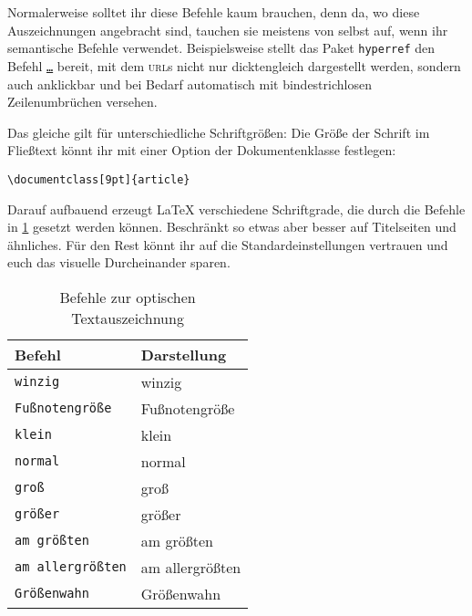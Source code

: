 Normalerweise solltet ihr diese Befehle kaum brauchen, denn da, wo diese Auszeichnungen angebracht sind, tauchen sie meistens von selbst auf, wenn ihr semantische Befehle verwendet.
Beispielsweise stellt das Paket \texttt{hyperref} den Befehl \texttt{\url{…}} bereit, mit dem \textsc{url}s nicht nur dicktengleich dargestellt werden, sondern auch anklickbar und bei Bedarf automatisch mit bindestrichlosen Zeilenumbrüchen versehen.

Das gleiche gilt für unterschiedliche Schriftgrößen: 
Die Größe der Schrift im Fließtext könnt ihr mit einer Option der Dokumentenklasse festlegen: 
\begin{verbatim}
\documentclass[9pt]{article}
\end{verbatim}
Darauf aufbauend erzeugt \LaTeX{} verschiedene Schriftgrade, die durch die Befehle in \cref{tbl:type-sizes} gesetzt werden können.
Beschränkt so etwas aber besser auf Titelseiten und ähnliches.
Für den Rest könnt ihr auf die Standardeinstellungen vertrauen und euch das visuelle Durcheinander sparen.

\begin{table}[H]
	\center
	\begin{tabular}{ll}
		\toprule
		Befehl & Darstellung \\
		\midrule
		\texttt{{\tiny winzig}} & {\tiny winzig} \\
		\texttt{{\footnotesize Fußnotengröße}} & {\footnotesize Fußnotengröße} \\
		\texttt{{\small klein}} & {\small klein} \\
		\texttt{{\normalsize normal}} & {\normalsize normal} \\
		\texttt{{\large groß}} & {\large groß} \\
		\texttt{{\Large größer}} & {\Large größer} \\
		\texttt{{\LARGE am größten}} & {\LARGE am größten} \\
		\texttt{{\huge am allergrößten}} & {\huge am allergrößten} \\
		\texttt{{\Huge Größenwahn}} & {\Huge Größenwahn} \\
		\bottomrule
	\end{tabular}
	\caption{Befehle zur optischen Textauszeichnung}
	\label{tbl:type-sizes}
\end{table}


